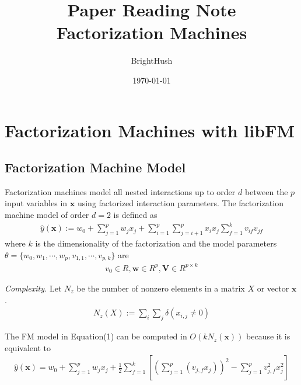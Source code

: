 \documentclass[UTF8]{ctexart}
\title{Paper Reading Note \\ Factorization Machines}
\author{BrightHush}
\date{\today}
\begin{document}
\maketitle
\tableofcontents

\newcommand{\figref}[1]{\figurename~\ref{#1}}

\section{Factorization Machines with libFM}

\subsection{Factorization Machine Model}
Factorization machines model all nested interactions up to order $d$ between
the $p$ input variables in $\textbf{x}$ using factorized interaction parameters.
The factorization machine model of order $d=2$ is defined as
\begin{align}
\hat{y}(\textbf{x}) := 
w_0 + \sum_{j=1}^{p} w_j x_j + \sum_{i=1}^p \sum_{j=i+1}^p x_i x_j \sum_{f=1}^k v_{if} v_{jf}
\end{align}
where $k$ is the dimensionality of the factorization and the model parameters 
$\theta = \{ w_0, w_1, \cdots, w_p, v_{1,1}, \cdots, v_{p,k} \}$ are
\begin{align}
v_0 \in R, \textbf{w} \in R^p, \textbf{V} \in R^{p \times k}
\end{align}

\par
\textit{Complexity.} Let $N_z$ be the number of nonzero elements in a matrix
$X$ or vector $\textbf{x}$.
\begin{align}
N_z(X) := \sum_{i} \sum_{j} \delta(x_{i,j} \neq 0)
\end{align}

\par
The FM model in Equation(1) can be computed in $O(kN_z(\textbf{x}))$ because
it is equivalent to 
\begin{align}
\hat{y}(\textbf{x}) = 
w_0 + \sum_{j=1}^p w_j x_j + \frac{1}{2} \sum_{f=1}^k 
\left[ (\sum_{j=1}^p(v_{j,f}x_j))^2 - \sum_{j=1}^p v_{j,f}^2 x_j^2 \right]
\end{align}
\end{document}
